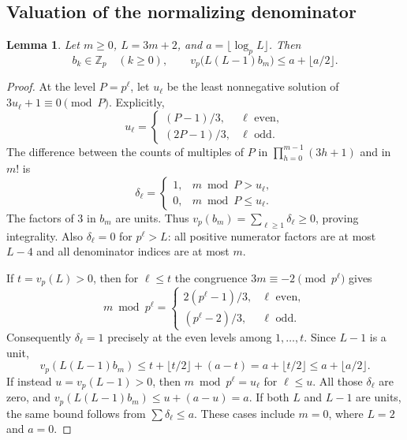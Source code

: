 \documentclass[11pt,letterpaper]{article}
\newtheorem{lemma}[theorem]{Lemma}
\numberwithin{equation}{section}
\begin{document}
\subsection{Valuation of the normalizing denominator}
\begin{lemma}\label{VIII-lem:e-normalization-bound}
Let $m\ge0$, $L=3m+2$, and $a=\lfloor\log_p L\rfloor$. Then
\[
 b_k\in\mathbb Z_p\quad(k\ge0),\qquad
 v_p\bigl(L(L-1)b_m\bigr)\le a+\lfloor a/2\rfloor.
\]
\end{lemma}
\begin{proof}
At the level $P=p^\ell$, let $u_\ell$ be the least nonnegative
solution of $3u_\ell+1\equiv0\pmod P$. Explicitly,
\[
 u_\ell=\begin{cases}(P-1)/3,&\ell\text{ even},\\
                       (2P-1)/3,&\ell\text{ odd}.
          \end{cases}
\]
The difference between the counts of multiples of $P$ in
$\prod_{h=0}^{m-1}(3h+1)$ and in $m!$ is
\[
 \delta_\ell=\begin{cases}1,&m\bmod P>u_\ell,\\0,&m\bmod P\le u_\ell.
                  \end{cases}
\]
The factors of $3$ in $b_m$ are units. Thus
$v_p(b_m)=\sum_{\ell\ge1}\delta_\ell\ge0$, proving integrality.
Also $\delta_\ell=0$ for $p^\ell>L$: all positive numerator
factors are at most $L-4$ and all denominator indices are at most $m$.

If $t=v_p(L)>0$, then for $\ell\le t$ the congruence
$3m\equiv-2\pmod{p^\ell}$ gives
\[
 m\bmod p^\ell=\begin{cases}
 2(p^\ell-1)/3,&\ell\text{ even},\\
 (p^\ell-2)/3,&\ell\text{ odd}.
 \end{cases}
\]
Consequently $\delta_\ell=1$ precisely at the even levels among
$1,\ldots,t$. Since $L-1$ is a unit,
\[
 v_p(L(L-1)b_m)
 \le t+\lfloor t/2\rfloor+(a-t)
 =a+\lfloor t/2\rfloor\le a+\lfloor a/2\rfloor.
\]
If instead $u=v_p(L-1)>0$, then $m\bmod p^\ell=u_\ell$ for
$\ell\le u$. All those $\delta_\ell$ are zero, and
$v_p(L(L-1)b_m)\le u+(a-u)=a$.
If both $L$ and $L-1$ are units, the same bound follows from
$\sum\delta_\ell\le a$. These cases include $m=0$, where $L=2$
and $a=0$.
\end{proof}
\end{document}
